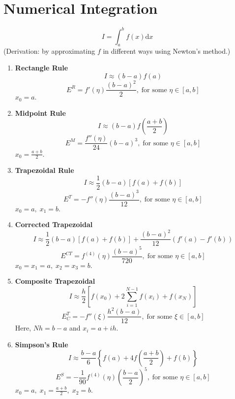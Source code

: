 \documentclass[12pt]{article}
\theoremstyle{definition}
\begin{document}
\section{Numerical Integration}
\[I = \int_{a}^{b} f(x) {\mathrm d}x\]
(Derivation: by approximating $f$ in different ways using Newton's method.)
\begin{enumerate} 
	\itemsep1em
	\item \textbf{Rectangle Rule}
		\[I \approx (b - a)f(a)\]
		\[E^R = f'(\eta)\frac{(b-a)^2}{2},\;\text{for some }\eta\in[a, b]\]
		$x_0 = a.$	

	\item \textbf{Midpoint Rule}
		\[I \approx (b - a)f\left(\frac{a + b}{2}\right) \]
		\[E^M = \frac{f''(\eta)}{24}(b - a)^3,\;\text{for some }\eta\in[a, b]\]
		$x_0 = \frac{a + b}{2}.$
		
	\item \textbf{Trapezoidal Rule}
		\[I \approx \frac{1}{2}(b - a)[f(a) + f(b)]\]
		\[E^T = -f''(\eta)\frac{(b - a)^3}{12},\;\text{for some }\eta\in[a, b]\]
		$x_0 = a,\;x_1 = b.$

	\item \textbf{Corrected Trapezoidal}
		\[I \approx \frac{1}{2}(b - a)[f(a) + f(b)] + \frac{(b - a)^2}{12}(f'(a) - f'(b))\]
		\[E^{CT} = f^{(4)}(\eta)\frac{(b - a)^5}{720},\;\text{for some }\eta\in[a, b]\]
		$x_0 = x_1 = a,\;x_2 = x_3 = b.$

	\item \textbf{Composite Trapezoidal}
		\[I \approx \frac{h}{2}\left[f(x_0) + 2\sum_{i=1}^{N-1}f(x_i) + f(x_N)\right]\]
		\[E_C^{T} = -f''(\xi)\frac{h^2(b-a)}{12},\;\text{for some }\xi\in[a, b]\]
		Here, $Nh = b-a$ and $x_i = a + ih.$\\

	\item \textbf{Simpson's Rule}
		\[I \approx \frac{b - a}{6}\left\{f(a) + 4f\left(\frac{a + b}{2}\right) + f(b)\right\}\]
		\[E^S = -\frac{1}{90}f^{(4)}(\eta)\left(\frac{b-a}{2}\right)^5,\;\text{for some }\eta\in[a, b]\]
		$x_0 = a,\;x_1 = \frac{a + b}{2},\;x_2 = b.$


\end{enumerate}
\end{document}
